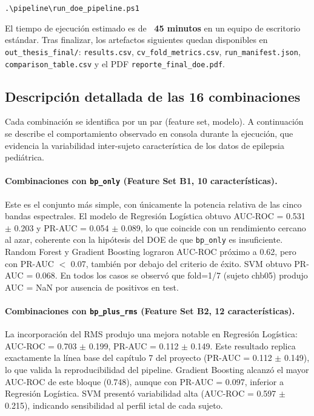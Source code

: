 \documentclass[12pt,a4paper]{article}
\begin{document}
\begin{center}
\texttt{.\textbackslash pipeline\textbackslash run\_doe\_pipeline.ps1}
\end{center}

\noindent El tiempo de ejecución estimado es de \textbf{~45 minutos} en un equipo de
escritorio estándar. Tras finalizar, los artefactos siguientes quedan disponibles en
\texttt{out\_thesis\_final/}: \texttt{results.csv}, \texttt{cv\_fold\_metrics.csv},
\texttt{run\_manifest.json}, \texttt{comparison\_table.csv} y el PDF
\texttt{reporte\_final\_doe.pdf}.

\subsection{Descripción detallada de las 16 combinaciones}

Cada combinación se identifica por un par (feature set, modelo). A continuación se
describe el comportamiento observado en consola durante la ejecución, que evidencia
la variabilidad inter-sujeto característica de los datos de epilepsia pediátrica.

\paragraph{Combinaciones con \texttt{bp\_only} (Feature Set B1, 10 características).}
Este es el conjunto más simple, con únicamente la potencia relativa de las cinco bandas
espectrales. El modelo de Regresión Logística obtuvo AUC-ROC = 0.531 $\pm$ 0.203 y
PR-AUC = 0.054 $\pm$ 0.089, lo que coincide con un rendimiento cercano al azar,
coherente con la hipótesis del DOE de que \texttt{bp\_only} es insuficiente. Random
Forest y Gradient Boosting lograron AUC-ROC próximo a 0.62, pero con PR-AUC $<$ 0.07,
también por debajo del criterio de éxito. SVM obtuvo PR-AUC = 0.068. En todos los casos
se observó que fold=1/7 (sujeto chb05) produjo AUC = NaN por ausencia de positivos en
test.

\paragraph{Combinaciones con \texttt{bp\_plus\_rms} (Feature Set B2, 12 características).}
La incorporación del RMS produjo una mejora notable en Regresión Logística: AUC-ROC =
0.703 $\pm$ 0.199, PR-AUC = 0.112 $\pm$ 0.149. Este resultado replica exactamente la
línea base del capítulo 7 del proyecto (PR-AUC = 0.112 $\pm$ 0.149), lo que valida la
reproducibilidad del pipeline. Gradient Boosting alcanzó el mayor AUC-ROC de este bloque
(0.748), aunque con PR-AUC = 0.097, inferior a Regresión Logística. SVM presentó
variabilidad alta (AUC-ROC = 0.597 $\pm$ 0.215), indicando sensibilidad al perfil ictal
de cada sujeto.
\end{document}
